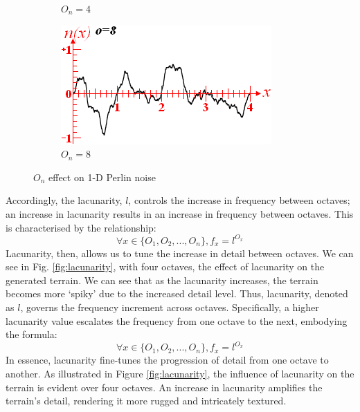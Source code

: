 \documentclass[12pt]{article}
\begin{document}
\begin{figure}[ht]
\begin{subfigure}{0.4\textwidth}
        \caption{$O_n=4$}
        \label{fig:octave4}
    \end{subfigure}
    \hfill
    \begin{subfigure}{0.4\textwidth}
        \centering
        \includegraphics[width=\linewidth]{octave8.png}
        \caption{$O_n=8$}
        \label{fig:octave8}
    \end{subfigure}
    \caption{$O_n$ effect on 1-D Perlin noise\cite{libnoise}}
    \label{fig:octaves-1d}
\end{figure}

Accordingly, the lacunarity, $l$, controls the increase in frequency between octaves; an increase in lacunarity results in an increase in frequency between octaves. This is characterised by the relationship:
$$\forall x \in \{O_1,O_2,...,O_n\}, f_x = l^{O_x}$$
Lacunarity, then, allows us to tune the increase in detail between octaves. We can see in Fig. \ref{fig:lacunarity}, with four octaves, the effect of lacunarity on the generated terrain. We can see that as the lacunarity increases, the terrain becomes more `spiky' due to the increased detail level. Thus, lacunarity, denoted as \(l\), governs the frequency increment across octaves. Specifically, a higher lacunarity value escalates the frequency from one octave to the next, embodying the formula:
$$
\forall x \in \{O_1, O_2, ..., O_n\}, f_x = l^{O_x}
$$
In essence, lacunarity fine-tunes the progression of detail from one octave to another. As illustrated in Figure \ref{fig:lacunarity}, the influence of lacunarity on the terrain is evident over four octaves. An increase in lacunarity amplifies the terrain's detail, rendering it more rugged and intricately textured.
\end{document}
